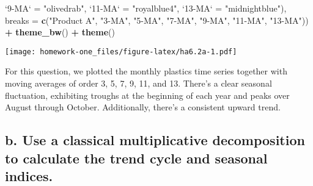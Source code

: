 \documentclass[openany]{book}
\newenvironment{Shaded}{\begin{snugshade}}{\end{snugshade}}
\newcommand{\CommentTok}[1]{\textcolor[rgb]{0.56,0.35,0.01}{\textit{#1}}}
\newcommand{\DataTypeTok}[1]{\textcolor[rgb]{0.13,0.29,0.53}{#1}}
\newcommand{\KeywordTok}[1]{\textcolor[rgb]{0.13,0.29,0.53}{\textbf{#1}}}
\newcommand{\NormalTok}[1]{#1}
\newcommand{\OperatorTok}[1]{\textcolor[rgb]{0.81,0.36,0.00}{\textbf{#1}}}
\newcommand{\StringTok}[1]{\textcolor[rgb]{0.31,0.60,0.02}{#1}}
\begin{document}
\begin{Shaded}
\begin{Highlighting}[]
  \StringTok{`}\DataTypeTok{9-MA}\StringTok{`}\NormalTok{ =}\StringTok{ "olivedrab"}\NormalTok{, }\StringTok{`}\DataTypeTok{11-MA}\StringTok{`}\NormalTok{ =}\StringTok{ "royalblue4"}\NormalTok{, }\StringTok{`}\DataTypeTok{13-MA}\StringTok{`}\NormalTok{ =}\StringTok{ "midnightblue"}\NormalTok{), }
  \DataTypeTok{breaks =} \KeywordTok{c}\NormalTok{(}\StringTok{"Product A"}\NormalTok{, }\StringTok{"3-MA"}\NormalTok{, }\StringTok{"5-MA"}\NormalTok{, }\StringTok{"7-MA"}\NormalTok{, }\StringTok{"9-MA"}\NormalTok{, }
    \StringTok{"11-MA"}\NormalTok{, }\StringTok{"13-MA"}\NormalTok{)) }\OperatorTok{+}\StringTok{ }\KeywordTok{theme_bw}\NormalTok{() }\OperatorTok{+}\StringTok{ }\KeywordTok{theme}\NormalTok{()}
\end{Highlighting}
\end{Shaded}

\texttt{[image: homework-one\_files/figure-latex/ha6.2a-1.pdf]}

For this question, we plotted the monthly plastics time series together with moving averages of order 3, 5, 7, 9, 11, and 13. There's a clear seasonal fluctuation, exhibiting troughs at the beginning of each year and peaks over August through October. Additionally, there's a consistent upward trend.

\hypertarget{b.-use-a-classical-multiplicative-decomposition-to-calculate-the-trend-cycle-and-seasonal-indices.}{%
\subsection{b. Use a classical multiplicative decomposition to calculate the trend cycle and seasonal indices.}\label{b.-use-a-classical-multiplicative-decomposition-to-calculate-the-trend-cycle-and-seasonal-indices.}}

\begin{Shaded}
\end{Shaded}
\end{document}
